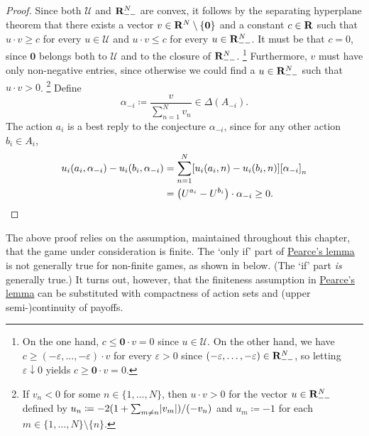 \begin{proof}
	Since both $\mathcal{U}$ and $\mathbf{R}_{--}^N$ are convex, it follows by the separating hyperplane theorem that there exists a vector $v \in \mathbf{R}^N \setminus \{\boldsymbol{0}\}$ and a constant $c \in \mathbf{R}$ such that $u \cdot v \geq c$ for every $u \in \mathcal{U}$ and $u \cdot v \leq c$ for every $u \in \mathbf{R}_{--}^N$. It must be that $c=0$, since $\boldsymbol{0}$ belongs both to $\mathcal{U}$ and to the closure of $\mathbf{R}_{--}^N$.%
		\footnote{On the one hand, $c \leq \boldsymbol{0} \cdot v = 0$ since $u \in \mathcal{U}$. On the other hand, we have $c \geq (-\varepsilon,\dots,-\varepsilon) \cdot v$ for every $\varepsilon>0$ since $(-\varepsilon,\dots,-\varepsilon) \in \mathbf{R}_{--}^N$, so letting $\varepsilon \downarrow 0$ yields $c \geq \boldsymbol{0} \cdot v = 0$.}
	Furthermore, $v$ must have only non-negative entries, since otherwise we could find a $u \in \mathbf{R}_{--}^N$ such that $u \cdot v > 0$.%
		\footnote{If $v_n < 0$ for some $n \in \{1,\dots,N\}$, then $u \cdot v > 0$ for the vector $u \in \mathbf{R}_{--}^N$ defined by $u_n \coloneqq - 2 ( 1 + \sum_{m \neq n} \abs*{v_m} ) / (-v_n)$ and $u_m \coloneqq -1$ for each $m \in \{1,\dots,N\} \setminus \{n\}$.}
	Define
	\begin{equation*}
		\alpha_{-i} \coloneqq \frac{v}{ \sum_{n=1}^N v_n } \in \Delta(A_{-i}) .
	\end{equation*}
	The action $a_i$ is a best reply to the conjecture $\alpha_{-i}$, since for any other action $b_i \in A_i$, 
	\begin{align*}
		u_i(a_i,\alpha_{-i})
		- u_i(b_i,\alpha_{-i})
		&= \sum_{n=1}^N
		\left[ u_i(a_i,n) - u_i(b_i,n) \right]
		\left[\alpha_{-i}\right]_n
		\\
		&= \left( U^{a_i} - U^{b_i} \right)
		\cdot \alpha_{-i}
		\geq 0 .
		\qedhere
	\end{align*}
\end{proof}

\begin{remark}
	\label{remark:pearce_finite}
	The above proof relies on the assumption, maintained throughout this chapter, that the game under consideration is finite. 
	The `only if' part of \hyperref[lemma:pearce]{Pearce's lemma} is not generally true for non-finite games, as shown in  below. (The `if' part \emph{is} generally true.)
	It turns out, however, that the finiteness assumption in \hyperref[lemma:pearce]{Pearce's lemma} can be substituted with compactness of action sets and (upper semi-)continuity of payoffs.
\end{remark}

